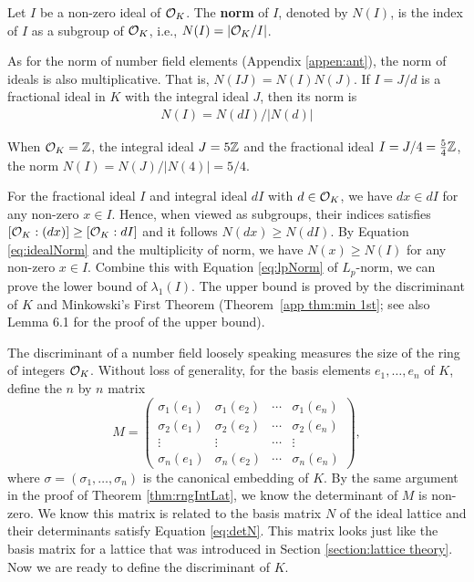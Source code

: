 \documentclass[../main.tex]{subfiles}
\begin{document}
\begin{definition}
\label{def:idealNorm}
\reversemarginpar
{}
Let $I$ be a non-zero ideal of $\mathcal{O}_K$. The \textbf{norm} of $I$, denoted by $N(I)$, is the index of $I$ as a subgroup of $\mathcal{O}_K$, i.e., $N(I) = |\mathcal{O}_K / I|$.
\end{definition}

As for the norm of number field elements (Appendix \ref{appen:ant}), the norm of ideals is also multiplicative. That is, $N(IJ) = N(I)N(J)$. If $I=J/d$ is a fractional ideal in $K$ with the integral ideal $J$, then its norm is
\begin{align}
\label{eq:idealNorm}
    N(I) = N(dI) / |N(d)|
\end{align}

\begin{example}
When $\mathcal{O}_K=\mathbb{Z}$, the integral ideal $J=5\mathbb{Z}$ and the fractional ideal $I=J/4=\frac{5}{4}\mathbb{Z}$, the norm $N(I)=N(J)/|N(4)|=5/4$.
\end{example}

For the fractional ideal $I$ and integral ideal $dI$ with $d \in \mathcal{O}_K$, we have $dx \in dI$ for any non-zero $x \in I$. Hence, when viewed as subgroups, their indices satisfies $[\mathcal{O}_K:(dx)] \ge [\mathcal{O}_K:dI]$ and it follows $N(dx)\ge N(dI)$. By Equation \ref{eq:idealNorm} and the multiplicity of norm, we have $N(x) \ge N(I)$ for any non-zero $x \in I$. Combine this with Equation \ref{eq:lpNorm} of $L_p$-norm, we can prove the lower bound of $\lambda_1(I)$. The upper bound is proved by the discriminant of $K$ and Minkowski's First Theorem (Theorem~\ref{app thm:min 1st}; see also Lemma 6.1 \cite{peikert2007lattices} for the proof of the upper bound).


The discriminant of a number field loosely speaking measures the size of the ring of integers $\mathcal{O}_K$. Without loss of generality, for the basis elements $e_1, \dots, e_n$ of $K$, define the $n$ by $n$ matrix 
\begin{equation*}
M = 
\begin{pmatrix}
\sigma_1(e_1) & \sigma_1(e_2) & \cdots & \sigma_1(e_n) \\
\sigma_2(e_1) & \sigma_2(e_2) & \cdots & \sigma_2(e_n) \\
\vdots & \vdots & \cdots & \vdots \\
\sigma_n(e_1) & \sigma_n(e_2) & \cdots & \sigma_n(e_n) 
\end{pmatrix},
\end{equation*}
where $\sigma=(\sigma_1,\dots,\sigma_n)$ is the canonical embedding of $K$. By the same argument in the proof of Theorem \ref{thm:rngIntLat}, we know the determinant of $M$ is non-zero. We know this matrix is related to the basis matrix $N$ of the ideal lattice and their determinants satisfy Equation \ref{eq:detN}. This matrix looks just like the basis matrix for a lattice that was introduced in Section \ref{section:lattice theory}. Now we are ready to define the discriminant of $K$. 
\end{document}
